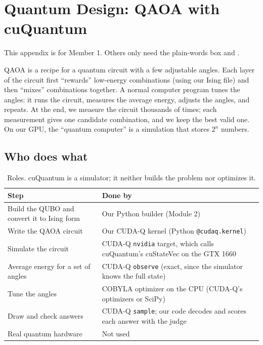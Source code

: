 \section{Quantum Design: QAOA with cuQuantum}
\label{app:quantum}

This appendix is for Member 1. Others only need the plain-words box and .

\begin{plainwords}
QAOA is a recipe for a quantum circuit with a few adjustable angles. Each layer of the circuit first ``rewards'' low-energy combinations (using our Ising file) and then ``mixes'' combinations together. A normal computer program tunes the angles: it runs the circuit, measures the average energy, adjusts the angles, and repeats. At the end, we measure the circuit thousands of times; each measurement gives one candidate combination, and we keep the best valid one. On our GPU, the ``quantum computer'' is a simulation that stores $2^n$ numbers.
\end{plainwords}

\subsection{Who does what}

\begin{table}[ht]
\centering
\small
\begin{tabularx}{\linewidth}{>{\raggedright\arraybackslash}p{4.2cm}X}
\toprule
Step & Done by \\
\midrule
Build the QUBO and convert it to Ising form & Our Python builder (Module 2) \\
Write the QAOA circuit & Our CUDA-Q kernel (Python \texttt{@cudaq.kernel}) \\
Simulate the circuit & CUDA-Q \texttt{nvidia} target, which calls cuQuantum's cuStateVec on the GTX 1660 \cite{cudaq_docs,bayraktar2023cuquantum} \\
Average energy for a set of angles & CUDA-Q \texttt{observe} (exact, since the simulator knows the full state) \\
Tune the angles & COBYLA optimizer on the CPU (CUDA-Q's optimizers or SciPy) \\
Draw and check answers & CUDA-Q \texttt{sample}; our code decodes and scores each answer with the judge \\
Real quantum hardware & Not used \\
\bottomrule
\end{tabularx}
\caption{Roles. cuQuantum is a simulator; it neither builds the problem nor optimizes it.}
\end{table}

